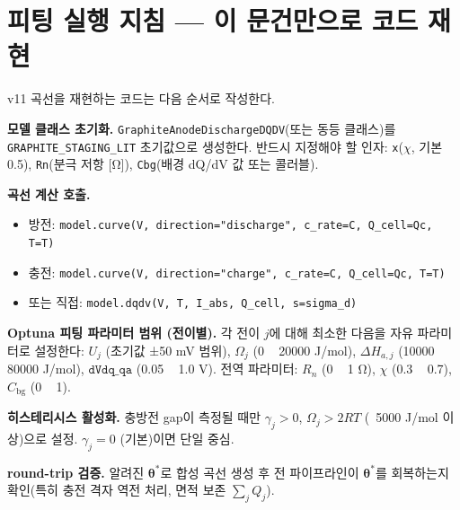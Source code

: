 \documentclass[11pt,a4paper]{article}
\newcommand{\bg}{\mathrm{bg}}
\begin{document}
\section{피팅 실행 지침 — 이 문건만으로 코드 재현}
\label{sec:fitting}
v11 곡선을 재현하는 코드는 다음 순서로 작성한다.

\textbf{모델 클래스 초기화.}
\texttt{GraphiteAnodeDischargeDQDV}(또는 동등 클래스)를
\texttt{GRAPHITE\_STAGING\_LIT} 초기값으로 생성한다.
반드시 지정해야 할 인자: \texttt{x}($\chi$, 기본 0.5),
\texttt{Rn}(분극 저항 [Ω]),
\texttt{Cbg}(배경 dQ/dV 값 또는 콜러블).

\textbf{곡선 계산 호출.}
\begin{itemize}[leftmargin=1.8em,itemsep=1pt]
\item 방전: \texttt{model.curve(V, direction="discharge", c\_rate=C, Q\_cell=Qc, T=T)}
\item 충전: \texttt{model.curve(V, direction="charge", c\_rate=C, Q\_cell=Qc, T=T)}
\item 또는 직접: \texttt{model.dqdv(V, T, I\_abs, Q\_cell, s=sigma\_d)}
\end{itemize}

\textbf{Optuna 피팅 파라미터 범위 (전이별).}
각 전이 $j$에 대해 최소한 다음을 자유 파라미터로 설정한다:
$U_j$ (초기값 ±50 mV 범위),
$\Omega_j$ (0 ~ 20000 J/mol),
$\Delta H_{a,j}$ (10000 ~ 80000 J/mol),
$\texttt{dVdq\_qa}$ (0.05 ~ 1.0 V).
전역 파라미터: $R_n$ (0 ~ 1 Ω), $\chi$ (0.3 ~ 0.7), $C_\bg$ (0 ~ 1).

\textbf{히스테리시스 활성화.}
충방전 gap이 측정될 때만 $\gamma_j > 0$, $\Omega_j > 2RT$ (~5000 J/mol 이상)으로 설정.
$\gamma_j=0$ (기본)이면 단일 중심.

\textbf{round-trip 검증.}
알려진 $\boldsymbol{\theta}^*$로 합성 곡선 생성 후 전 파이프라인이 $\boldsymbol{\theta}^*$를
회복하는지 확인(특히 충전 격자 역전 처리, 면적 보존 $\sum_j Q_j$).
\end{document}
